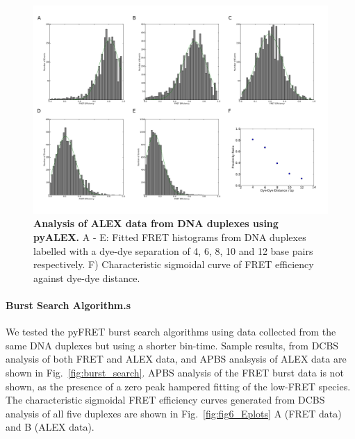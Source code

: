 \begin{figure}[!ht]
   \begin{center}
      \includegraphics*[clip=true, width=6in]{pyFRET/FRET_ALEX.pdf}
      \caption{{\bf Analysis of ALEX data from DNA duplexes using pyALEX.} A - E: Fitted FRET histograms from DNA duplexes labelled with a dye-dye separation of 4, 6, 8, 10 and 12 base pairs respectively. F) Characteristic sigmoidal curve of FRET efficiency against dye-dye distance.}
      \label{fig:fig5_ALEX_plots}
   \end{center}
\end{figure}


\paragraph{Burst Search Algorithm.s}
We tested the pyFRET burst search algorithms using data collected from the same DNA duplexes but using a shorter bin-time. Sample results, from DCBS analysis of both FRET and ALEX data, and APBS analsysis of ALEX data are shown in Fig.~\ref{fig:burst_search}. APBS analysis of the FRET burst data is not shown, as the presence of a zero peak hampered fitting of the low-FRET species. The characteristic sigmoidal FRET efficiency curves generated from DCBS analysis of all five duplexes are shown in Fig.~\ref{fig:fig6_Eplots} A (FRET data) and B (ALEX data).

